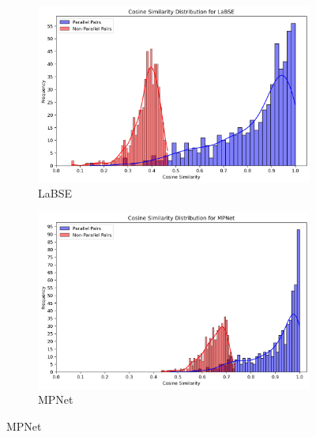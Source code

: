 \documentclass[12pt]{article}
\begin{document}
\begin{figure}[htbp]
\begin{subfigure}{0.45\textwidth}
    \centering
    \includegraphics[width=\linewidth]{nonpar_par_histogram_LaBSE.png}
    \caption{LaBSE}
    \label{fig:labse_dist}
\end{subfigure}
\hfill
\begin{subfigure}{0.45\textwidth}
    \centering
    \includegraphics[width=\linewidth]{nonpar_par_histogram_MPNet.png}
    \caption{MPNet}
    \label{fig:mpnet_dist}
\end{subfigure}

\vspace{1em}
\end{figure}
\end{document}
